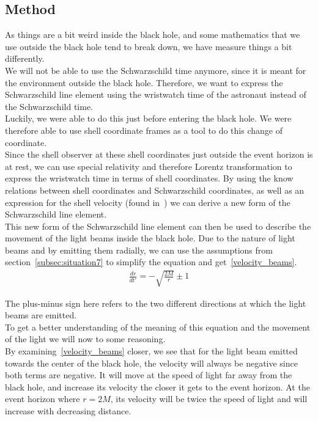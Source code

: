 \documentclass[reprint,english,notitlepage]{revtex4-2}
\begin{document}
    \subsection{Method}\label{subsec:method7}
        As things are a bit weird inside the black hole, and some mathematics that we use outside the black hole tend to break down, we have measure things a bit differently.\\
        We will not be able to use the Schwarzschild time anymore, since it is meant for the environment outside the black hole.
        Therefore, we want to express the Schwarzschild line element using the wristwatch time of the astronaut instead of the Schwarzschild time.\\
        Luckily, we were able to do this just before entering the black hole.
        We were therefore able to use shell coordinate frames as a tool to do this change of coordinate.\\

        Since the shell observer at these shell coordinates just outside the event horizon is at rest, we can use special relativity and therefore Lorentz transformation to express the wristwatch time in terms of shell coordinates.
        By using the know relations between shell coordinates and Schwarzschild coordinates, as well as an expression for the shell velocity (found in~\parencite[][page 7]{lecture2d}) we can derive a new form of the Schwarzschild line element.\\

        This new form of the Schwarzschild line element can then be used to describe the movement of the light beams inside the black hole.
        Due to the nature of light beams and by emitting them radially, we can use the assumptions from section~\ref{subsec:situation7} to simplify the equation and get~\eqref{velocity_beams}.
        \begin{align}
            \frac{dr}{dt'} = -\sqrt{\frac{2M}{r}} \pm 1 \label{velocity_beams}
        \end{align}

        The plus-minus sign here refers to the two different directions at which the light beams are emitted.\\

        To get a better understanding of the meaning of this equation and the movement of the light we will now to some reasoning.\\
        By examining~\eqref{velocity_beams} closer, we see that for the light beam emitted towards the center of the black hole, the velocity will always be negative since both terms are negative.
        It will move at the speed of light far away from the black hole, and increase its velocity the closer it gets to the event horizon.
        At the event horizon where $r = 2M$, its velocity will be twice the speed of light and will increase with decreasing distance.\\
\end{document}
